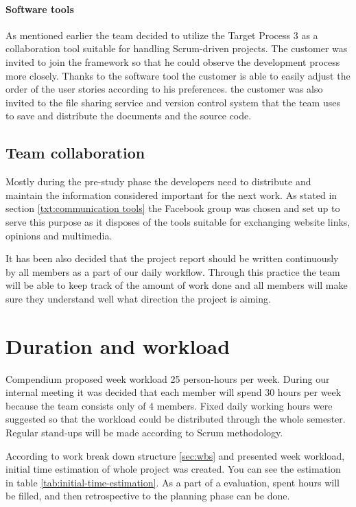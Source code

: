 \paragraph{Software tools}
As mentioned earlier the team decided to utilize the Target Process 3 as a collaboration tool suitable for handling Scrum-driven projects. The customer was invited to join the framework so that he could observe the development process more closely. Thanks to the software tool the customer is able to easily adjust the order of the user stories according to his preferences. the customer was also invited to the file sharing service and version control system that the team uses to save and distribute the documents and the source code.

\subsection{Team collaboration}
Mostly during the pre-study phase the developers need to distribute and maintain the information considered important for the next work. As stated in section \ref{txt:communication tools} the Facebook group was chosen and set up to serve this purpose as it disposes of the tools suitable for exchanging website links, opinions and multimedia.

It has been also decided that the project report should be written continuously by all members as a part of our daily workflow. Through this practice the team will be able to keep track of the amount of work done and all members will make sure they understand well what direction the project is aiming.

\section{Duration and workload} \label{txt:duration_and_workload}
Compendium proposed week workload 25 person-hours per week. 
During our internal meeting it was decided that each member will spend 30 hours per week because the team consists only of 4 members. 
Fixed daily working hours were suggested so that the workload could be distributed through the whole semester.
Regular stand-ups will be made according to Scrum methodology.

According to work break down structure \ref{sec:wbs} and presented week workload, initial time estimation of whole project was created. 
You can see the estimation in table \ref{tab:initial-time-estimation}. 
As a part of a evaluation, spent hours will be filled, and then retrospective to the planning phase can be done.

